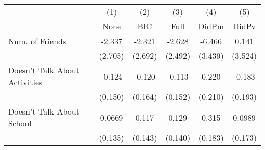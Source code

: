 {
\def\sym#1{\ifmmode^{#1}\else\(^{#1}\)\fi}
\begin{tabular}{l*{5}{c}}
\toprule
            &\multicolumn{1}{c}{(1)}&\multicolumn{1}{c}{(2)}&\multicolumn{1}{c}{(3)}&\multicolumn{1}{c}{(4)}&\multicolumn{1}{c}{(5)}\\
            &\multicolumn{1}{c}{None}&\multicolumn{1}{c}{BIC}&\multicolumn{1}{c}{Full}&\multicolumn{1}{c}{DidPm}&\multicolumn{1}{c}{DidPv}\\
\midrule
Num. of Friends&      -2.337         &      -2.321         &      -2.628         &      -6.466         &       0.141         \\
            &     (2.705)         &     (2.692)         &     (2.492)         &     (3.439)         &     (3.524)         \\
\addlinespace
Doesn't Talk About Activities&      -0.124         &      -0.120         &      -0.113         &       0.220         &      -0.183         \\
            &     (0.150)         &     (0.164)         &     (0.152)         &     (0.210)         &     (0.193)         \\
\addlinespace
Doesn't Talk About School&      0.0669         &       0.117         &       0.129         &       0.315         &      0.0989         \\
            &     (0.135)         &     (0.143)         &     (0.140)         &     (0.183)         &     (0.173)         \\
\bottomrule
\end{tabular}
}
